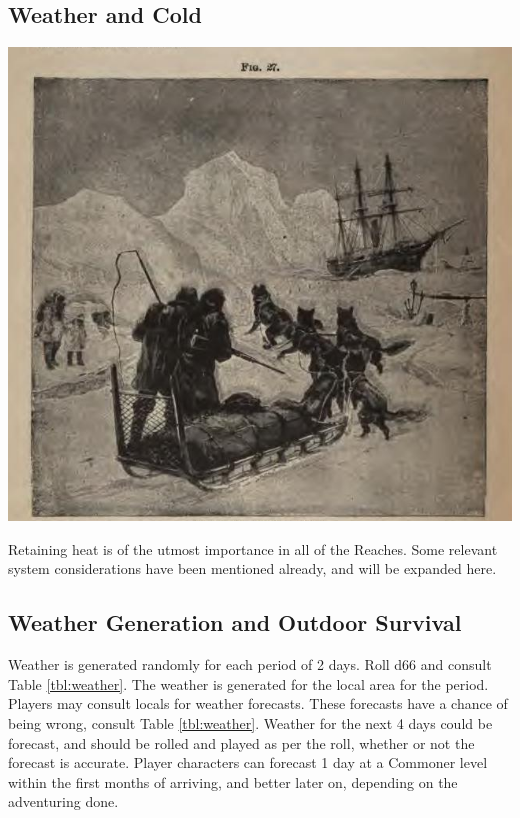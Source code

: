 \documentclass[notitlepage]{article}
\begin{document}
\begin{multicols}{2}
\section{Weather and Cold}

{\centering \includegraphics[width=\columnwidth]{arctic-sledders}
}

Retaining heat is of the utmost importance in all of the Reaches.
Some relevant system considerations have been mentioned already, and will be expanded here. \\

\subsection*{Weather Generation and Outdoor Survival}
\label{sec:weather-outdoor}

Weather is generated randomly for each period of 2 days. Roll d66 and consult Table \ref{tbl:weather}. The weather is generated for the local area for the period. \\

Players may consult locals for weather forecasts.
These forecasts have a chance of being wrong, consult Table \ref{tbl:weather}.
Weather for the next 4 days could be forecast, and should be rolled and played as per the roll, whether or not the forecast is accurate.
Player characters can forecast 1 day at a Commoner level within the first months of arriving, and better later on, depending on the adventuring done. \\


\end{multicols}
\end{document}
